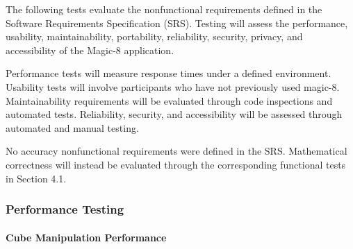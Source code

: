 \documentclass[12pt, titlepage]{article}
\renewcommand{\wss}[1]{}
\begin{document}

The following tests evaluate the nonfunctional requirements defined in the
Software Requirements Specification (SRS). Testing will assess the
performance, usability, maintainability, portability, reliability,
security, privacy, and accessibility of the Magic-8 application.

Performance tests will measure response times under a defined
environment. Usability tests will involve participants who have not
previously used magic-8. Maintainability requirements will be
evaluated through code inspections and automated tests.
Reliability, security, and accessibility will be assessed through
automated and manual testing.

No accuracy nonfunctional requirements were defined in the
SRS. Mathematical correctness will instead be evaluated through the
corresponding functional tests in Section 4.1.

\subsubsection{Performance Testing}

\paragraph{Cube Manipulation Performance}
\end{document}
